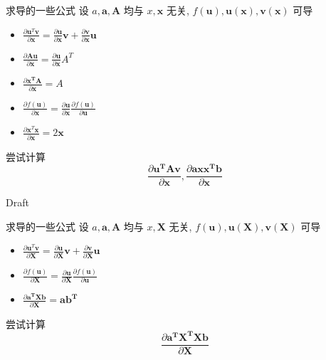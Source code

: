\documentclass{ctexbeamer}
\begin{document}
\begin{frame}{求导的一些公式}
设 $a, \boldsymbol{a,A}$ 均与 $x,\boldsymbol{x}$ 无关, $f(\boldsymbol u),\boldsymbol {u(x),v(x)}$ 可导
\begin{itemize}
    \item $\frac{\partial \boldsymbol u^T\boldsymbol v}{\partial \boldsymbol x}=\frac{\partial \boldsymbol u}{\partial \boldsymbol x}\boldsymbol v+\frac{\partial \boldsymbol v}{\partial \boldsymbol x}\boldsymbol u$
    \item $\frac{\partial \boldsymbol{Au}}{\partial \boldsymbol x} = \frac{\partial \boldsymbol u}{\partial \boldsymbol x}A^T$
    \item $\frac{\partial \boldsymbol{x^TA}}{\partial \boldsymbol x} = A$
    \item $\frac{\partial f(\boldsymbol u)}{\partial \boldsymbol x} = \frac{\partial \boldsymbol u}{\partial \boldsymbol  x}\frac{\partial f(\boldsymbol u)}{\partial \boldsymbol u}$
    \item $\frac{\partial \boldsymbol x^T\boldsymbol x}{\partial \boldsymbol x}=2\boldsymbol  x$
    
\end{itemize}
尝试计算 $$\frac{\partial \boldsymbol {u^TAv}}{\partial \boldsymbol x}, \frac{\partial \boldsymbol {axx^Tb}}{\partial \boldsymbol x}$$
    
\end{frame}

\begin{frame}{Draft}

    
\end{frame}


\begin{frame}{求导的一些公式}
设 $a, \boldsymbol{a,A}$ 均与 $x,\boldsymbol{X}$ 无关, $f(\boldsymbol u),\boldsymbol {u(X),v(X)}$ 可导
\begin{itemize}
	\item $\frac{\partial \boldsymbol u^T\boldsymbol v}{\partial \boldsymbol X}=\frac{\partial \boldsymbol u}{\partial \boldsymbol X}\boldsymbol v+\frac{\partial \boldsymbol v}{\partial \boldsymbol X}\boldsymbol u$
    \item $\frac{\partial f(\boldsymbol u)}{\partial \boldsymbol X} = \frac{\partial \boldsymbol u}{\partial \boldsymbol  X}\frac{\partial f(\boldsymbol u)}{\partial \boldsymbol u}$
    \item $\frac{\partial \boldsymbol {a^TXb}}{\partial \boldsymbol X}=\boldsymbol  {ab^T}$
    
\end{itemize}
尝试计算 $$\frac{\partial \boldsymbol {a^TX^TXb}}{\partial \boldsymbol X}$$
    
\end{frame}
\end{document}
